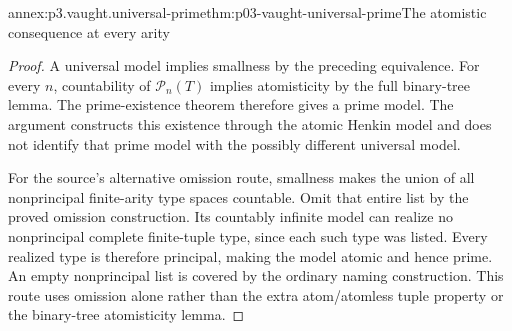 \begin{annexitem}{annex:p3.vaught.universal-prime}{thm:p03-vaught-universal-prime}{The atomistic consequence at every arity}
\begin{proof}
A universal model implies smallness by the preceding equivalence.
For every \(n\), countability of \(\mathcal P_n(T)\) implies
atomisticity by the full binary-tree lemma.
The prime-existence theorem therefore gives a prime model.
The argument constructs this existence through the atomic
Henkin model and does not identify that prime model with the
possibly different universal model.

For the source's alternative omission route, smallness makes the
union of all nonprincipal finite-arity type spaces countable.
Omit that entire list by the proved omission construction.
Its countably infinite model can realize no nonprincipal complete
finite-tuple type, since each such type was listed. Every realized
type is therefore principal, making the model atomic and hence prime.
An empty nonprincipal list is covered by the ordinary naming construction.
This route uses omission alone rather than the extra atom/atomless
tuple property or the binary-tree atomisticity lemma.
\end{proof}
\end{annexitem}

